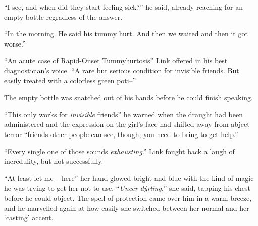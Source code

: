 \documentclass[../FGP.tex]{subfiles}
\begin{document}
\begin{fragment}
``I see, and when did they start feeling sick?'' he said, already reaching for an empty bottle regradless of the answer. 

``In the morning. He said his tummy hurt. And then we waited and then it got worse.''



``An acute case of Rapid-Onset Tummyhurtosis'' Link offered in his best diagnostician's voice. ``A rare but serious condition for invisible friends. But easily treated with a colorless green poti--''

The empty bottle was snatched out of his hands before he could finish speaking. 

``This only works for \emph{invisible} friends'' he warned when the draught had been administered and the expression on the girl's face had shifted away from abject terror ``friends other people can see, though, you need to bring to get help.'' 
\end{fragment}

\begin{fragment}



``Every single one of those sounds \emph{exhausting}.'' Link fought back a laugh of incredulity, but not successfully. 

``At least let me -- here'' her hand glowed bright and blue with the kind of magic he was trying to get her not to use. ``\emph{Uncer dýrling},'' she said, tapping his chest before he could object. The spell of protection came over him in a warm breeze, and he marvelled again at how easily she switched between her normal and her `casting' accent. 
\end{fragment}
\end{document}
